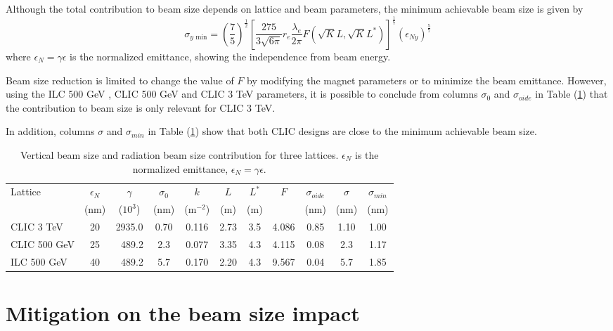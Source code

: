    Although the total contribution to beam size depends on lattice and beam parameters, the minimum achievable beam size is given by
\begin{equation}
 \sigma_{y \text{ min}} = \left(\frac{7}{5}\right)^\frac{1}{2}\left[\frac{275}{3\sqrt{6\pi}}r_e\frac{\lambda_e}{2\pi}F(\sqrt{K}L,\sqrt{K}L^*)\right]^\frac{1}{7}(\epsilon_{Ny})^\frac{5}{7}
\end{equation}
where $\epsilon_N=\gamma\epsilon$ is the normalized emittance, showing the independence from beam energy.\par
Beam size reduction is limited to change the value of $F$ by modifying the magnet parameters or to minimize the beam emittance. However, using the ILC 500 GeV \cite{ILCdes}, CLIC 500 GeV and CLIC 3 TeV \cite{CLICdes} parameters, it is possible to conclude from columns $\sigma_0$ and $\sigma_{oide}$ in Table (\ref{t:Sigmas}) that the contribution to beam size is only relevant for CLIC 3 TeV.\par
In addition, columns $\sigma$ and $\sigma_{min}$ in Table (\ref{t:Sigmas}) show that both CLIC designs are close to the minimum achievable beam size.\par
\begin{table}[!hbt]
\centering
{\scriptsize
\begin{tabular}{l||c|c|c||c|c|c|c|c||c|c}\hline\hline
Lattice &$\epsilon_N$& $\gamma$& $\sigma_0$&$k$&$L$&$L^*$& $F$ & $\sigma_{oide}$&$\sigma$&$\sigma_{min}$\\
 &(nm)&($10^3$)&(nm)&(m$^{-2}$)&(m)&(m)&&(nm) &(nm)&(nm)\\\hline
CLIC 3 TeV & 20 & 2935.0 & 0.70 & 0.116 & 2.73 &3.5&  4.086  & 0.85 & 1.10& 1.00 \\
CLIC 500 GeV & 25 & $\;\;$489.2 & 2.3 & 0.077 & 3.35 &4.3& 4.115 & 0.08 & 2.3 & 1.17\\
ILC  500 GeV & 40 & $\;\;$489.2 & 5.7 & 0.170 & 2.20 &4.3& 9.567 & 0.04 & 5.7 & 1.85\\\hline
\end{tabular}\caption{Vertical beam size and radiation beam size contribution for three lattices. $\epsilon_N$ is the normalized emittance, $\epsilon_N=\gamma\epsilon$.}\label{t:Sigmas}
}
\end{table}
\section{Mitigation on the beam size impact}
